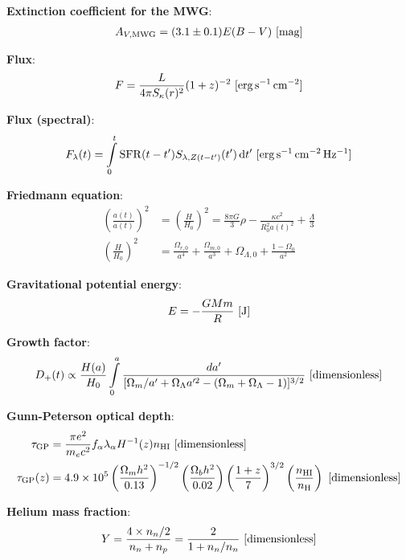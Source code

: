 \documentclass[a4paper,11pt]{article}
\begin{document}
{\noindent}\textbf{Extinction coefficient for the MWG}:
\begin{align*}
    A_{V,\mathrm{MWG}} = (3.1\pm0.1)E(B-V) ~ [{\rm mag}]
\end{align*}

{\noindent}\textbf{Flux}:
\begin{align*}
    F = \frac{L}{4\pi S_\kappa(r)^2}(1+z)^{-2} ~ [{\rm erg\,s^{-1}\,cm^{-2}}]
\end{align*}

{\noindent}\textbf{Flux (spectral)}:
\begin{align*}
    F_\lambda(t) = \int\limits_0^t \mathrm{SFR}(t-t')S_{\lambda,Z(t-t')}(t')\,\mathrm{d}t' ~ [{\rm erg\,s^{-1}\,cm^{-2}\,Hz^{-1}}]
\end{align*}

{\noindent}\textbf{Friedmann equation}:
\begin{align*}
    \left(\frac{\dot{a(t)}}{a(t)}\right)^2 &=  \left(\frac{H}{H_0}\right)^2 = \frac{8\pi G}{3}\rho - \frac{\kappa c^2}{R_0^2a(t)^2} + \frac{\Lambda}{3} \\
    \left(\frac{H}{H_0}\right)^2 &= \frac{\Omega_{r,0}}{a^4} + \frac{\Omega_{m,0}}{a^3} + \Omega_{\Lambda,0} + \frac{1-\Omega_0}{a^2}
\end{align*}

{\noindent}\textbf{Gravitational potential energy}:
\begin{align*}
    E = -\frac{GMm}{R} ~ [{\rm J}]
\end{align*}

{\noindent}\textbf{Growth factor}:
\begin{align*}
    D_+(t) \propto \frac{H(a)}{H_0}\int\limits_0^a \frac{da'}{[\Omega_m/a'+\Omega_\Lambda a'^2-(\Omega_m+\Omega_\Lambda-1)]^{3/2}} ~ [{\rm dimensionless}]
\end{align*}

{\noindent}\textbf{Gunn-Peterson optical depth}:
\begin{align*}
    \tau_\mathrm{GP} &= \frac{\pi e^2}{m_ec^2}f_\alpha\lambda_\alpha H^{-1}(z)n_\mathrm{HI} ~ [{\rm dimensionless}] \\
    \tau_\mathrm{GP}(z) &= 4.9\times10^5 \left(\frac{\Omega_mh^2}{0.13}\right)^{-1/2} \left(\frac{\Omega_bh^2}{0.02}\right) \left(\frac{1+z}{7}\right)^{3/2} \left(\frac{n_\mathrm{HI}}{n_\mathrm{H}}\right) ~ [{\rm dimensionless}]
\end{align*}

{\noindent}\textbf{Helium mass fraction}:
\begin{align*}
    Y = \frac{4\times n_n/2}{n_n + n_p}  = \frac{2}{1 + n_n/n_n} ~ [{\rm dimensionless}]
\end{align*}
\end{document}
